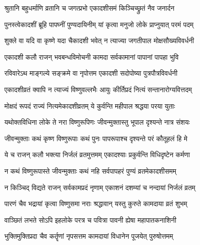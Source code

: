 \label{sec:padma-purushottama-krishna-parama}

\ganapatyadiDhyanam
\padmaPuranam



\twolineshloka
{श्रुतानि बहुधर्माणि व्रतानि च जगत्प्रभो}
{एकादशीसमं किञ्चिच्छ्रुतं नैव जनार्दन}%

\twolineshloka
{पुनस्त्वेकादशीं ब्रूहि पापघ्नीं पुण्यदायिनीम्}
{यां कृत्वा मनुजो लोके प्राप्नुयात् परमं पदम्}%


\twolineshloka
{शुक्ले वा यदि वा कृष्णे यदा चैकादशी भवेत्}
{न त्याज्या जगतीपाल मोक्षसौख्यविवर्धनी}%

\twolineshloka
{एकादशी कलौ राजन् भवबन्धविमोचनी}
{कामदा सर्वकामानां पापानां पापहा भुवि}%

\twolineshloka
{रविवारेऽथ माङ्गल्ये सङ्क्रमे वा नृपोत्तम}
{एकादशी सदोपोष्या पुत्रपौत्रविवर्धनी}%

\twolineshloka
{एकादशीव्रतं क्वापि न त्याज्यं विष्णुवल्लभैः}
{आयुः कीर्तिप्रदं नित्यं सन्तानारोग्यवित्तदम्}%

\twolineshloka
{मोक्षदं रूपदं राज्यं नित्यमेकादशीव्रतम्}
{ये कुर्वन्ति महीपाल श्रद्धया परया युताः}%

\twolineshloka
{यथोक्तविधिना लोके ते नरा विष्णुरूपिणः }
{जीवन्मुक्तास्तु भूपाल दृश्यन्ते नात्र संशयः}%


\twolineshloka
{जीवन्मुक्ताः कथं कृष्ण विष्णुरूपाः कथं पुनः}
{पापरूपाश्च दृश्यन्ते परं कौतूहलं हि मे}%


\twolineshloka
{ये च राजन् कलौ भक्त्या निर्जलं व्रतमुत्तमम्}
{एकादश्याः प्रकुर्वन्ति विधिदृष्टेन कर्मणा}%

\twolineshloka
{न कथं विष्णुरूपास्ते जीवन्मुक्ताः कथं नहि}
{सर्वपापहरं पुण्यं व्रतमेकादशीसमम्}%

\twolineshloka
{न किञ्चिद् विद्यते राजन् सर्वकामप्रदं नृणाम्}
{एकाशनं दशम्यां च नन्दायां निर्जलं व्रतम्}%

\twolineshloka
{पारणं चैव भद्रायां कृत्वा विष्णुसमा नराः}
{श्रद्धावान् यस्तु कुरुते कामदाया व्रतं शुभम्}%

\twolineshloka
{वाञ्छितं लभते सोऽपि इहलोके परत्र च}
{पवित्रा पावनी ह्येषा महापातकनाशिनी}%

\twolineshloka
{भुक्तिमुक्तिप्रदा चैव कर्तॄणां नृपसत्तम}
{कामदायां विधानेन पूजयेत् पुरुषोत्तमम्}%

